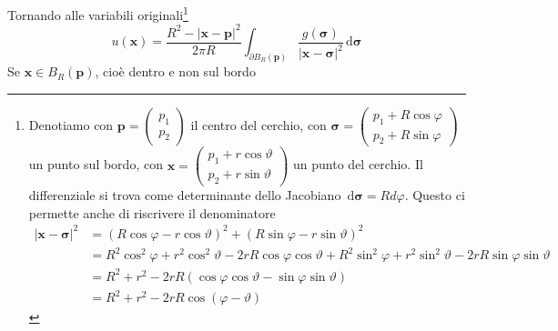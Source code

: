 \documentclass[10pt,a4paper,twoside,openright]{book}
\newcommand{\x}{\mathbf{x}}
\newcommand{\sigg}{\bm{\sigma}}
\newcommand{\de}{\,\mathrm d}
\newcommand{\dsig}{\de \sigg}
\begin{document}
\begin{dimostrazione}
    Tornando alle variabili originali\footnote{Denotiamo con $\mathbf{p} =
            \begin{pmatrix}
                p_{1} \\
                p_{2}
            \end{pmatrix}$ il centro del cerchio, con $\sigg =
            \begin{pmatrix}
                p_{1} +R\cos \varphi \\
                p_{2} +R\sin \varphi
            \end{pmatrix}$ un punto sul bordo, con $\x =
            \begin{pmatrix}
                p_{1} +r\cos \vartheta \\
                p_{2} +r\sin \vartheta
            \end{pmatrix}$ un punto del cerchio. Il differenziale si trova come determinante dello Jacobiano $\dsig =Rd\varphi $. Questo ci permette anche di riscrivere il denominatore
        \begin{align*}
            | \x -\sigg| ^{2} & =(R\cos \varphi -r\cos \vartheta)^{2} +(R\sin \varphi -r\sin \vartheta)^{2}                                                                                     \\
                              & =R^{2}\cos^{2} \varphi +r^{2}\cos^{2} \vartheta -2rR\cos \varphi \cos \vartheta +R^{2}\sin^{2} \varphi +r^{2}\sin^{2} \vartheta -2rR\sin \varphi \sin \vartheta \\
                              & =R^{2} +r^{2} -2rR(\cos \varphi \cos \vartheta -\sin \varphi \sin \vartheta)                                                                                    \\
                              & =R^{2} +r^{2} -2rR\cos(\varphi -\vartheta)
        \end{align*}}
    \begin{equation}
        u(\x) =\frac{R^{2} -| \x -\mathbf{p}| ^{2}}{2\pi R}\int _{\partial B_{R}(\mathbf{p})}\frac{g(\sigg)}{| \x -\sigg| ^{2}} \dsig
        \label{eq:poisson-cerchio-dim}
    \end{equation}
    Se $\x \in B_{R}(\mathbf{p})$, cioè dentro e non sul bordo

    \begin{figure}[H]
        \centering


        \begin{tikzpicture}[x=0.75pt,y=0.75pt,yscale=-1,xscale=1]


\end{tikzpicture}
\end{figure}
\end{dimostrazione}
\end{document}
